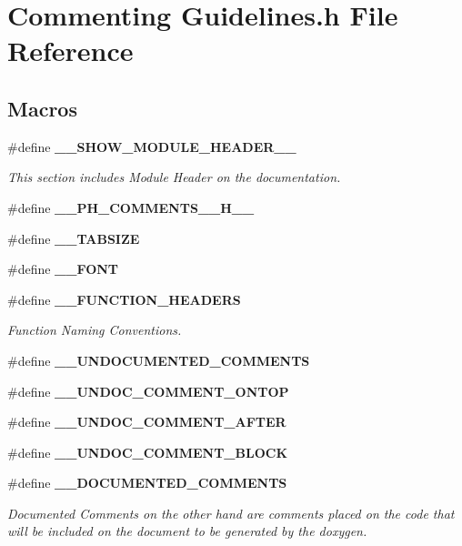 \section{Commenting Guidelines.\-h File Reference}
\label{_commenting_01_guidelines_8h}
\subsection*{Macros}
\begin{DoxyCompactItemize}
\item 
\#define {\bf \-\_\-\-\_\-\-S\-H\-O\-W\-\_\-\-M\-O\-D\-U\-L\-E\-\_\-\-H\-E\-A\-D\-E\-R\-\_\-\-\_\-}
\begin{DoxyCompactList}\small\item\em This section includes Module Header on the documentation. \end{DoxyCompactList}\item 
\#define {\bf \-\_\-\-\_\-\-P\-H\-\_\-\-C\-O\-M\-M\-E\-N\-T\-S\-\_\-\-\_\-\-H\-\_\-\-\_\-}
\item 
\#define {\bf \-\_\-\-\_\-\-T\-A\-B\-S\-I\-Z\-E}
\item 
\#define {\bf \-\_\-\-\_\-\-F\-O\-N\-T}
\item 
\#define {\bf \-\_\-\-\_\-\-F\-U\-N\-C\-T\-I\-O\-N\-\_\-\-H\-E\-A\-D\-E\-R\-S}
\begin{DoxyCompactList}\small\item\em Function Naming Conventions. \end{DoxyCompactList}\item 
\#define {\bf \-\_\-\-\_\-\-U\-N\-D\-O\-C\-U\-M\-E\-N\-T\-E\-D\-\_\-\-C\-O\-M\-M\-E\-N\-T\-S}
\item 
\#define {\bf \-\_\-\-\_\-\-U\-N\-D\-O\-C\-\_\-\-C\-O\-M\-M\-E\-N\-T\-\_\-\-O\-N\-T\-O\-P}
\item 
\#define {\bf \-\_\-\-\_\-\-U\-N\-D\-O\-C\-\_\-\-C\-O\-M\-M\-E\-N\-T\-\_\-\-A\-F\-T\-E\-R}
\item 
\#define {\bf \-\_\-\-\_\-\-U\-N\-D\-O\-C\-\_\-\-C\-O\-M\-M\-E\-N\-T\-\_\-\-B\-L\-O\-C\-K}
\item 
\#define {\bf \-\_\-\-\_\-\-D\-O\-C\-U\-M\-E\-N\-T\-E\-D\-\_\-\-C\-O\-M\-M\-E\-N\-T\-S}
\begin{DoxyCompactList}\small\item\em Documented Comments on the other hand are comments placed on the code that will be included on the document to be generated by the doxygen. \end{DoxyCompactList}\item 

\end{DoxyCompactItemize}
